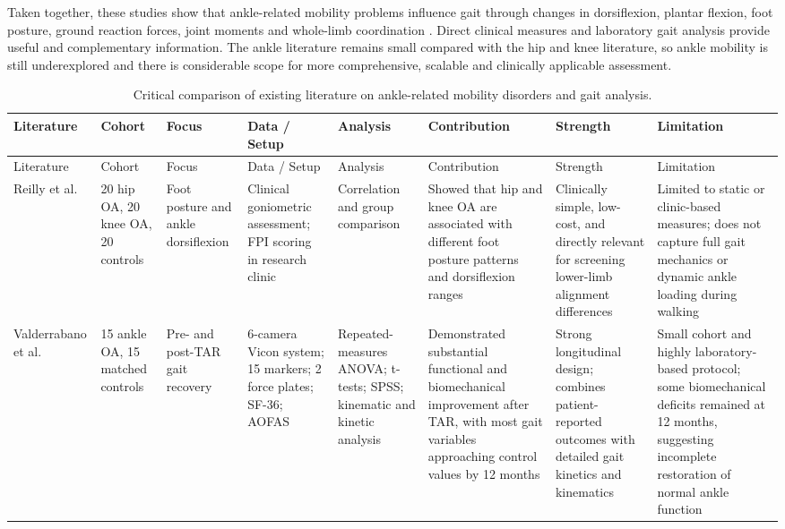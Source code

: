 \documentclass[12pt]{elsarticle}
\begin{document}
{ Taken together, these} studies show that ankle-related mobility problems influence gait through changes in dorsiflexion, plantar flexion, foot posture, ground reaction forces, joint { moments} and whole-limb coordination \cite{reilly2009role,valderrabano2007gait,schmitt2015effect}. { Direct} clinical measures and { laboratory} gait analysis provide useful and complementary information. { The ankle literature remains small compared with the} hip and knee { literature, so ankle mobility is still} underexplored and there is considerable scope for more comprehensive, { scalable} and clinically applicable assessment.




{\scriptsize
\setlength{\tabcolsep}{2pt}
\renewcommand{\arraystretch}{1.03}
\begin{longtable}{p{1.9cm} p{1.6cm} p{1.9cm} p{1.9cm} p{1.7cm} p{1.9cm} p{2.0cm} p{3.0cm}}
\caption{Critical comparison of existing literature on ankle-related mobility disorders and gait analysis.}
\label{ankle_critical_extended_summary} \\
\hline
Literature & Cohort & Focus & Data / Setup & Analysis & Contribution & Strength & Limitation \\
\hline
\endfirsthead

\hline
Literature & Cohort & Focus & Data / Setup & Analysis & Contribution & Strength & Limitation \\
\hline
\endhead

Reilly et al. \cite{reilly2009role}
& 20 hip OA, 20 knee OA, 20 controls
& Foot posture and ankle dorsiflexion
& Clinical goniometric assessment; FPI scoring in research clinic
& Correlation and group comparison
& Showed that hip and knee OA are associated with different foot posture patterns and dorsiflexion ranges
& Clinically simple, low-cost, and directly relevant for screening lower-limb alignment differences
& Limited to static or clinic-based measures; does not capture full gait mechanics or dynamic ankle loading during walking \\
\hline

Valderrabano et al. \cite{valderrabano2007gait}
& 15 ankle OA, 15 matched controls
& Pre- and post-TAR gait recovery
& 6-camera Vicon system; 15 markers; 2 force plates; SF-36; AOFAS
& Repeated-measures ANOVA; t-tests; SPSS; kinematic and kinetic analysis
& Demonstrated substantial functional and biomechanical improvement after TAR, with most gait variables approaching control values by 12 months
& Strong longitudinal design; combines patient-reported outcomes with detailed gait kinetics and kinematics
& Small cohort and highly laboratory-based protocol; some biomechanical deficits remained at 12 months, suggesting incomplete restoration of normal ankle function \\
\hline


\end{longtable}}
\end{document}
